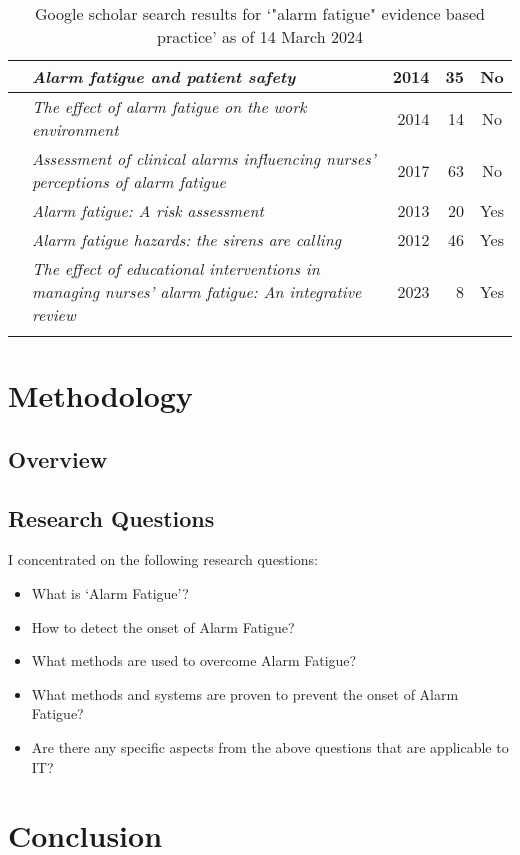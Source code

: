 \documentclass[]{report}
\begin{document}
\begin{longtable}{
			|>{\raggedright\arraybackslash}p{3.7cm}
			|>{\raggedright\arraybackslash}p{3.7cm}
			|r
			|r
			|c
			|}
        \hline 
		\citet{horkan2014alarm} & \textit{Alarm fatigue and patient safety} & 2014 & 35 & No \\
		\hline
		\citet{blake2014effect} & \textit{The effect of alarm fatigue on the work environment} & 2014 & 14 & No \\
		\hline
		\citet{petersen2017assessment} & \textit{Assessment of clinical alarms influencing nurses' perceptions of alarm fatigue} & 2017 & 63 & No \\
		\hline
		\citet{baillargeon2013alarm} & \textit{Alarm fatigue: A risk assessment} & 2013 & 20 & Yes \\
		\hline
		\citet{welch2012alarm} & \textit{Alarm fatigue hazards: the sirens are calling} & 2012 & 46 & Yes \\
		\hline
		\citet{nyarko2023effect} & \textit{The effect of educational interventions in managing nurses' alarm fatigue: An integrative review} & 2023 & 8 & Yes \\
		\hline
		
	    \caption{Google scholar search results for `"alarm fatigue" evidence based practice' as of 14 March 2024} 
	\end{longtable}

    \chapter{Methodology}
    
    \section{Overview}
    
    \section{Research Questions}
    
    I concentrated on the following research questions:
    
    \begin{itemize}
    	\item What is `Alarm Fatigue'?
    	\item How to detect the onset of Alarm Fatigue?
    	\item What methods are used to overcome Alarm Fatigue?
    	\item What methods and systems are proven to prevent the onset of Alarm Fatigue?
    	\item Are there any specific aspects from the above questions that are applicable to IT?
    \end{itemize}

	
	
	
	
	
	
	
	
	\chapter{Conclusion}
	
	
\end{document}
